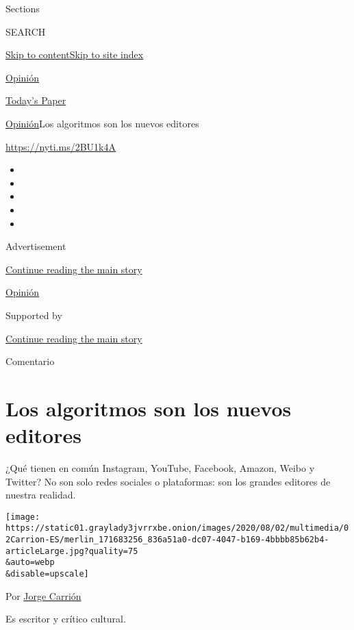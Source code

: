 Sections

SEARCH

\protect\hyperlink{site-content}{Skip to
content}\protect\hyperlink{site-index}{Skip to site index}

\href{https://www.nytimes3xbfgragh.onion/es/section/opinion}{Opinión}

\href{https://myaccount.nytimes3xbfgragh.onion/auth/login?response_type=cookie\&client_id=vi}{}

\href{https://www.nytimes3xbfgragh.onion/section/todayspaper}{Today's
Paper}

\href{/es/section/opinion}{Opinión}\textbar{}Los algoritmos son los
nuevos editores

\url{https://nyti.ms/2BU1k4A}

\begin{itemize}
\item
\item
\item
\item
\item
\end{itemize}

Advertisement

\protect\hyperlink{after-top}{Continue reading the main story}

\href{/es/section/opinion}{Opinión}

Supported by

\protect\hyperlink{after-sponsor}{Continue reading the main story}

Comentario

\hypertarget{los-algoritmos-son-los-nuevos-editores}{%
\section{Los algoritmos son los nuevos
editores}\label{los-algoritmos-son-los-nuevos-editores}}

¿Qué tienen en común Instagram, YouTube, Facebook, Amazon, Weibo y
Twitter? No son solo redes sociales o plataformas: son los grandes
editores de nuestra realidad.

\texttt{[image: https://static01.graylady3jvrrxbe.onion/images/2020/08/02/multimedia/02Carrion-ES/merlin\_171683256\_836a51a0-dc07-4047-b169-4bbbb85b62b4-articleLarge.jpg?quality=75\\\&auto=webp\\\&disable=upscale]}

Por \href{https://www.nytimes3xbfgragh.onion/by/jorge-carrion}{Jorge
Carrión}

Es escritor y crítico cultural.

